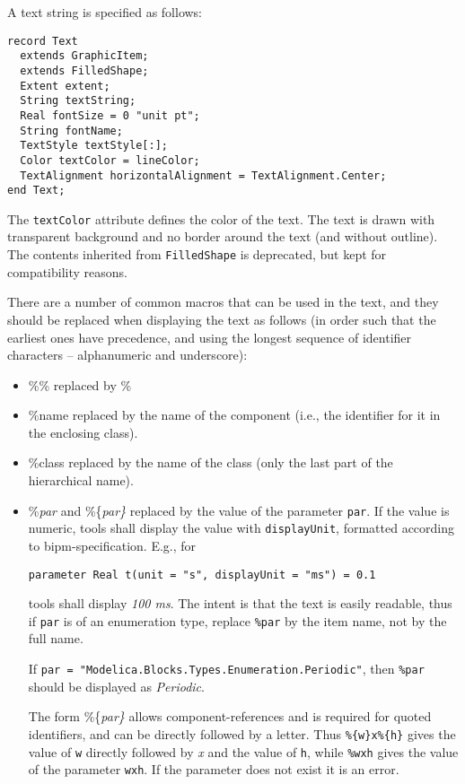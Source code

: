 A text string is specified as follows:
\begin{lstlisting}[language=modelica]
record Text
  extends GraphicItem;
  extends FilledShape;
  Extent extent;
  String textString;
  Real fontSize = 0 "unit pt";
  String fontName;
  TextStyle textStyle[:];
  Color textColor = lineColor;
  TextAlignment horizontalAlignment = TextAlignment.Center;
end Text;
\end{lstlisting}%
The \lstinline!textColor! attribute defines the color of the text.
The text is drawn with transparent background and no border around the text (and without outline).
The contents inherited from \lstinline!FilledShape! is deprecated, but kept for compatibility reasons.

There are a number of common macros that can be used in the text, and they should be replaced when displaying the text as follows (in order such that the earliest ones have precedence, and using the longest sequence of identifier characters -- alphanumeric and underscore):
\begin{itemize}
\item
  \%\% replaced by \%
\item
  \%name replaced by the name of the component (i.e., the identifier for
  it in the enclosing class).
\item
  \%class replaced by the name of the class (only the last part of the hierarchical name).
\item
  \%\emph{par} and \%\{\emph{par\}} replaced by the value of the
  parameter \lstinline!par!.
  If the value is numeric, tools shall display the value with \lstinline!displayUnit!, formatted according to bipm-specification.
  E.g., for
\begin{lstlisting}[language=modelica]
parameter Real t(unit = "s", displayUnit = "ms") = 0.1
\end{lstlisting}
  tools shall display \emph{100 ms}.
  The intent is that the text is easily readable,
  thus if \lstinline!par! is of an enumeration type, replace \lstinline!%par! by the item name,
  not by the full name.
  \begin{example}
  If \lstinline!par = "Modelica.Blocks.Types.Enumeration.Periodic"!, then \lstinline!%par! should be displayed as \emph{Periodic}.
  \end{example}
  The form \%\{\emph{par\}} allows component-references and is required for quoted identifiers, and can be directly
  followed by a letter. Thus \lstinline!%{w}x%{h}! gives the value of \lstinline!w!
  directly followed by \emph{x} and the value of \lstinline!h!, while \lstinline!%wxh! gives the value of the
  parameter \lstinline!wxh!. If the parameter does not exist it is an error.
\end{itemize}

